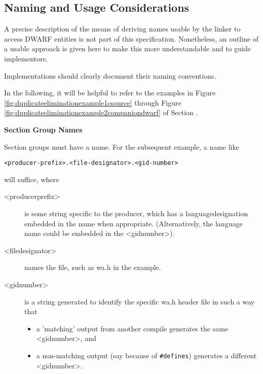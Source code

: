 \subsection{Naming and Usage Considerations}
\label{app:namingandusageconsiderations}

A precise description of the means of deriving names usable
by the linker to access DWARF entities is not part of this
specification. Nonetheless, an outline of a usable approach
is given here to make this more understandable and to guide
implementors.

Implementations should clearly document their naming conventions.

In the following, it will be helpful to refer to the examples
in 
Figure \ref{fig:duplicateeliminationexample1csource}
through 
Figure \ref{fig:duplicateeliminationexample2companiondwarf}
of 
Section .

\textbf{Section Group Names}

Section groups must have a  name.
For the subsequent 
 example, a name like
\begin{alltt}
    <producer-prefix>.<file-designator>.<gid-number>
\end{alltt}
will suffice, where

\begin{description}

\item  [\textless producer\dash prefix\textgreater] 
is some string specific to the
producer, which has a language\dash designation embedded in the
name when appropriate. (Alternatively, the language name
could be embedded in the 
\textless gid\dash number\textgreater).


\item  [\textless file\dash designator\textgreater]
names the file, such as wa.h in
the example.


\item  [\textless gid\dash number\textgreater]
is a string generated to identify the
specific wa.h header file in such a way that

\begin{itemize}

\item  a 'matching' output from another compile generates
the same 
\textless gid\dash number\textgreater,
and

\item  a non-matching output (say because of \texttt{\#defines})
generates a different 
\textless gid\dash number\textgreater.
\end{itemize}

\end{description}

